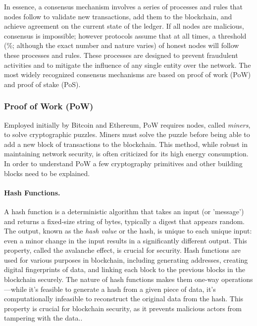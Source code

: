In essence, a consensus mechanism involves a series of processes and rules that nodes follow to validate new transactions, add them to the blockchain, and achieve agreement on the current state of the ledger. If all nodes are malicious, consensus is impossible; however protocols assume that at all times, a threshold (\%; although the exact number and nature varies) of honest nodes will follow these processes and rules. These processes are designed to prevent fraudulent activities and to mitigate the influence of any single entity over the network. The most widely recognized consensus mechanisms are based on proof of work (PoW) and proof of stake (PoS).

\subsubsection{Proof of Work (PoW)} \label{pow}

Employed initially by Bitcoin and Ethereum, PoW requires nodes, called \textit{miners}, to solve cryptographic puzzles. Miners must solve the puzzle before being able to add a new block of transactions to the blockchain. This method, while robust in maintaining network security, is often criticized for its high energy consumption. In order to understand PoW a few cryptography primitives and other building blocks need to be explained.

\paragraph{Hash Functions.}
A hash function is a deterministic algorithm that takes an input (or 'message') and returns a fixed-size string of bytes, typically a digest that appears random. The output, known as the \textit{hash value} or the hash, is unique to each unique input: even a minor change in the input results in a significantly different output. This property, called the avalanche effect, is crucial for security. Hash functions are used for various purposes in blockchain, including generating addresses, creating digital fingerprints of data, and linking each block to the previous blocks in the blockchain securely. The nature of hash functions makes them one-way operations---while it's feasible to generate a hash from a given piece of data, it's computationally infeasible to reconstruct the original data from the hash. This property is crucial for blockchain security, as it prevents malicious actors from tampering with the data.. 

